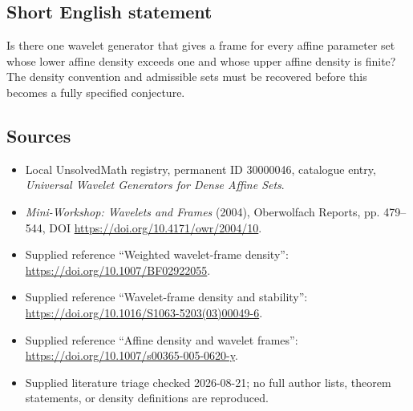 \documentclass[11pt]{article}
\begin{document}
\subsection{Short English statement}
Is there one wavelet generator that gives a frame for every affine parameter set whose lower affine density exceeds one and whose upper affine density is finite? The density convention and admissible sets must be recovered before this becomes a fully specified conjecture.
\subsection{Sources}
\begin{itemize}
\item Local UnsolvedMath registry, permanent ID 30000046, catalogue entry, \emph{Universal Wavelet Generators for Dense Affine Sets}.
\item \emph{Mini-Workshop: Wavelets and Frames} (2004), Oberwolfach Reports, pp. 479--544, DOI \url{https://doi.org/10.4171/owr/2004/10}.
\item Supplied reference ``Weighted wavelet-frame density'': \url{https://doi.org/10.1007/BF02922055}.
\item Supplied reference ``Wavelet-frame density and stability'': \url{https://doi.org/10.1016/S1063-5203(03)00049-6}.
\item Supplied reference ``Affine density and wavelet frames'': \url{https://doi.org/10.1007/s00365-005-0620-y}.
\item Supplied literature triage checked 2026-08-21; no full author lists, theorem statements, or density definitions are reproduced.
\end{itemize}
\end{document}
